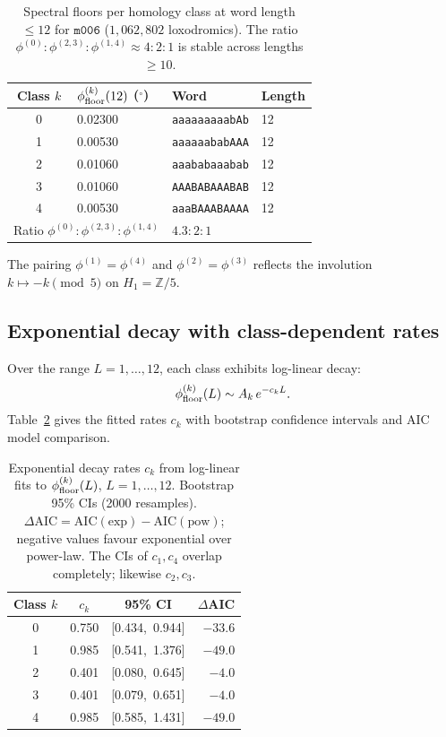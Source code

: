 \documentclass[11pt,a4paper]{article}
\theoremstyle{remark}
\newcommand{\mfld}[1]{\texttt{#1}}
\newcommand{\word}[1]{\texttt{#1}}
\newcommand{\Zfive}{\mathbb{Z}/5}
\begin{document}
\begin{table}[htbp]
\centering
\caption{Spectral floors per homology class at word length $\leq 12$
for $\mfld{m006}$ ($1{,}062{,}802$ loxodromics).
The ratio $\phi^{(0)}:\phi^{(2,3)}:\phi^{(1,4)}\approx 4{:}2{:}1$
is stable across lengths $\geq 10$.}
\label{tab:floors_L12}
\begin{tabular}{clll}
\toprule
Class $k$ & $\phi_{\rm floor}^{(k)}(12)$ (${}^\circ$) & Word & Length \\
\midrule
0 & 0.02300 & \word{aaaaaaaaabAb} & 12 \\
1 & 0.00530 & \word{aaaaaababAAA} & 12 \\
2 & 0.01060 & \word{aaababaaabab} & 12 \\
3 & 0.01060 & \word{AAABABAAABAB} & 12 \\
4 & 0.00530 & \word{aaaBAAABAAAA} & 12 \\
\midrule
\multicolumn{2}{l}{Ratio $\phi^{(0)}:\phi^{(2,3)}:\phi^{(1,4)}$}
& \multicolumn{2}{l}{$4.3:2:1$} \\
\bottomrule
\end{tabular}
\end{table}

The pairing $\phi^{(1)}=\phi^{(4)}$ and $\phi^{(2)}=\phi^{(3)}$
reflects the involution $k\mapsto -k\pmod{5}$ on $H_1=\Zfive$.

\subsection{Exponential decay with class-dependent rates}

Over the range $L=1,\ldots,12$, each class exhibits log-linear decay:
\begin{equation}
\phi_{\rm floor}^{(k)}(L) \sim A_k\,e^{-c_k L}.
\label{eq:exp_decay}
\end{equation}
Table~\ref{tab:rates} gives the fitted rates $c_k$ with bootstrap
confidence intervals and AIC model comparison.

\begin{table}[htbp]
\centering
\caption{Exponential decay rates $c_k$ from log-linear fits
to $\phi_{\rm floor}^{(k)}(L)$, $L=1,\ldots,12$.
Bootstrap 95\% CIs (2000 resamples).
$\Delta\mathrm{AIC} = \mathrm{AIC}(\text{exp}) - \mathrm{AIC}(\text{pow})$;
negative values favour exponential over power-law.
The CIs of $c_1,c_4$ overlap completely; likewise $c_2,c_3$.}
\label{tab:rates}
\begin{tabular}{cccr}
\toprule
Class $k$ & $c_k$ & 95\% CI & $\Delta$AIC \\
\midrule
0 & 0.750 & [0.434,\ 0.944] & $-33.6$ \\
1 & 0.985 & [0.541,\ 1.376] & $-49.0$ \\
2 & 0.401 & [0.080,\ 0.645] & $-4.0$  \\
3 & 0.401 & [0.079,\ 0.651] & $-4.0$  \\
4 & 0.985 & [0.585,\ 1.431] & $-49.0$ \\
\bottomrule
\end{tabular}
\end{table}
\end{document}
